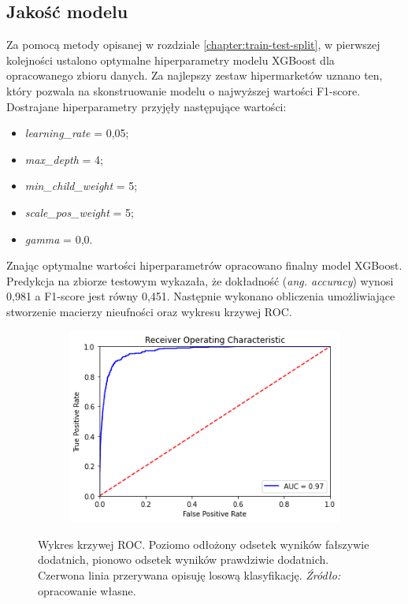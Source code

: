 \documentclass[polish, twoside, 12pt, a4paper]{article}
\theoremstyle{definition}
\theoremstyle{plain}
\theoremstyle{remark}
\begin{document}
\subsection{Jakość modelu}

Za pomocą metody opisanej w rozdziale \ref{chapter:train-test-split}, w pierwszej kolejności ustalono optymalne hiperparametry modelu XGBoost dla opracowanego zbioru danych. Za najlepszy zestaw hipermarketów uznano ten, który pozwala na skonstruowanie modelu o najwyższej wartości F1-score. Dostrajane hiperparametry przyjęły następujące wartości:
\begin{itemize}[noitemsep]
 \item \emph{learning\_rate} = 0,05;
 \item \emph{max\_depth} = 4;
 \item \emph{min\_child\_weight} = 5;
 \item \emph{scale\_pos\_weight} = 5;
 \item \emph{gamma} = 0,0.
\end{itemize}

Znając optymalne wartości hiperparametrów opracowano finalny model XGBoost. Predykcja na zbiorze testowym wykazała, że dokładność (\emph{ang. accuracy}) wynosi 0,981 a F1-score jest równy 0,451. Następnie wykonano obliczenia umożliwiające stworzenie macierzy nieufności oraz wykresu krzywej ROC.

\begin{figure}[H]
  \centering
  \begin{subfigure}[t]{\textwidth}
	\centering
    \includegraphics[width=10cm]{roc.png}
  \end{subfigure}
  \captionsetup{margin=10pt,font=small,labelfont=bf,width=.8\textwidth}
  \caption{Wykres krzywej ROC. Poziomo odłożony odsetek wyników fałszywie dodatnich, pionowo odsetek wyników prawdziwie dodatnich. Czerwona linia przerywana opisuję losową klasyfikację. \textit{Źródło:} opracowanie własne.}
\end{figure}
\end{document}
